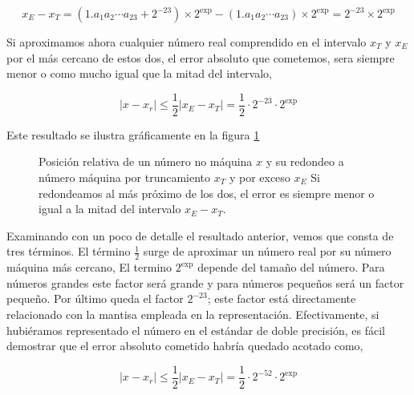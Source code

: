 \begin{equation*}
x_E-x_T= (1.a_1a_2\cdots a_{23}+2^{-23})\times2^\text{exp}- (1.a_1a_2\cdots a_{23})\times2^{\text{exp}}=2^{-23}\times 2^\text{exp}
\end{equation*}

\begin{paracol}{2}
Si aproximamos ahora cualquier número real comprendido en el intervalo $x_T$ y $x_E$ por el más cercano de estos dos, el error absoluto que cometemos, sera siempre menor o como mucho igual que la mitad del intervalo,
\end{paracol}

\begin{equation*}
\vert x-x_r \vert \leq \frac{1}{2}\vert x_E-x_T \vert= \frac{1}{2}\cdot 2^{-23}\cdot 2^\text{exp}
\end{equation*}

\begin{paracol}{2}
Este resultado se ilustra gráficamente en la figura 	\ref{fig:errorred}
\end{paracol}

\begin{figure}[h]
\centering
{}
\caption{Posición relativa de un número no máquina $x$ y su redondeo a número máquina por truncamiento $x_T$ y por exceso $x_E$ Si redondeamos al más próximo de los dos, el error es siempre menor o igual a la mitad del intervalo $x_E-x_T$.}
\label{fig:errorred}
\end{figure} 

\begin{paracol}{2}
Examinando con un poco de detalle el resultado anterior, vemos que consta de tres términos. El término $\frac{1}{2}$ surge de aproximar un número real por su número máquina más cercano, El termino $2^\text{exp}$ depende del tamaño del número. Para números grandes este factor será grande y para números pequeños será un factor pequeño. Por último queda el factor $2^{-23}$;  este factor está directamente relacionado con la mantisa empleada en la representación. Efectivamente, si hubiéramos  representado el número en el estándar de doble precisión, es fácil demostrar que el error absoluto cometido habría quedado acotado como,
\end{paracol}
 \begin{equation*}
\vert x-x_r \vert \leq \frac{1}{2}\vert x_E-x_T \vert= \frac{1}{2}\cdot 2^{-52}\cdot 2^\text{exp}
\end{equation*}

